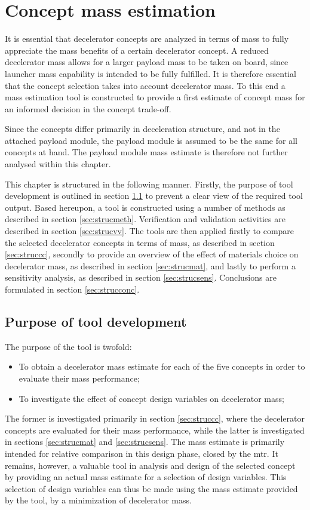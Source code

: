 \section{Concept mass estimation} \label{ch:strucmass}
It is essential that decelerator concepts are analyzed in terms of mass to fully appreciate the mass benefits of a certain decelerator concept. A reduced decelerator mass allows for a larger payload mass to be taken on board, since launcher mass capability is intended to be fully fulfilled. It is therefore essential that the concept selection takes into account decelerator mass. To this end a mass estimation tool is constructed to provide a first estimate of concept mass for an informed decision in the concept trade-off.

Since the concepts differ primarily in deceleration structure, and not in the attached payload module, the payload module is assumed to be the same for all concepts at hand. The payload module mass estimate is therefore not further analysed within this chapter.

This chapter is structured in the following manner. Firstly, the purpose of tool development is outlined in section \ref{sec:strucpurp} to prevent a clear view of the required tool output. Based hereupon, a tool is constructed using a number of methods as described in section \ref{sec:strucmeth}. Verification and validation activities are described in section \ref{sec:strucvv}. The tools are then applied firstly to compare the selected decelerator concepts in terms of mass, as described in section \ref{sec:struccc}, secondly to provide an overview of the effect of materials choice on decelerator mass, as described in section \ref{sec:strucmat}, and lastly to perform a sensitivity analysis, as described in section \ref{sec:strucsens}. Conclusions are formulated in section \ref{sec:strucconc}.

\subsection{Purpose of tool development}\label{sec:strucpurp}
The purpose of the tool is twofold:
\begin{itemize}
\item To obtain a decelerator mass estimate for each of the five concepts in order to evaluate their mass performance;
\item To investigate the effect of concept design variables on decelerator mass;
\end{itemize}
The former is investigated primarily in section \ref{sec:struccc}, where the decelerator concepts are evaluated for their mass performance, while the latter is investigated in sections \ref{sec:strucmat} and \ref{sec:strucsens}. The mass estimate is primarily intended for relative comparison in this design phase, closed by the \acrfull{mtr}. It remains, however, a valuable tool in analysis and design of the selected concept by providing an actual mass estimate for a selection of design variables. This selection of design variables can thus be made using the mass estimate provided by the tool, by a minimization of decelerator mass.

